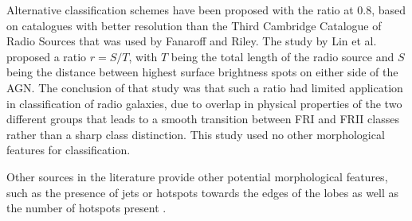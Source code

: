 \documentclass[conference]{IEEEtran}
\begin{document}



Alternative classification schemes have been proposed with the ratio at 0.8, based on catalogues with better resolution than the Third Cambridge Catalogue of Radio Sources that was used by Fanaroff and Riley. 
The study by Lin et al. \cite{lin_2010} proposed a ratio $r = S/T$, with $T$ being the total length of the radio source and $S$ being the distance between highest surface brightness spots on either side of the AGN. The conclusion of that study was that such a ratio had limited application in classification of radio galaxies, due to overlap in physical properties of the two different groups that leads to a smooth transition between FRI and FRII classes rather than a sharp class distinction. This study used no other morphological features for classification.

Other sources in the literature provide other potential morphological features, 
such as the presence of jets \cite{owen_laing_1989} or hotspots towards the edges of 
the lobes \cite{gendre_wall_2009} as well as the number of hotspots present \cite{lukic2018}.
\end{document}
